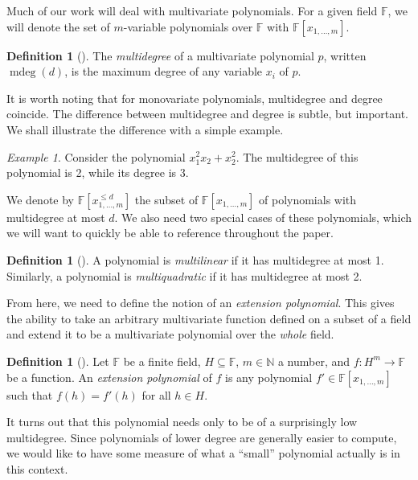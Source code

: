 \documentclass{reedthesis}
\theoremstyle{plain}
\theoremstyle{definition}
\newtheorem{defn}[thm]{Definition}
\theoremstyle{remark}
\newtheorem{example}{Example}[thm]
\DeclareMathOperator{\mdeg}{mdeg}
\numberwithin{equation}{section}
\begin{document}
Much of our work will deal with multivariate polynomials. For a given field
$\mathbb{F}$, we will denote the set of $m$-variable polynomials over
$\mathbb{F}$ with $\mathbb{F}[x_{1, \ldots, m}]$.

\begin{defn}[{\cite[8]{AW09}}]\label{def:mdeg}
  The \emph{multidegree} of a multivariate polynomial $p$, written $\mdeg(d)$,
  is the maximum degree of any variable $x_{i}$ of $p$.
\end{defn}

It is worth noting that for monovariate polynomials, multidegree and degree
coincide. The difference between multidegree and degree is subtle, but
important. We shall illustrate the difference with a simple example.

\begin{example}
  Consider the polynomial $x_{1}^{2}x_{2} + x_{2}^{2}$. The multidegree of this
  polynomial is 2, while its degree is 3.
\end{example}

We denote by $\mathbb{F}[x_{1, \ldots, m}^{\le d}]$ the subset of
$\mathbb{F}[x_{1, \ldots, m}]$ of polynomials with multidegree at most $d$. We also
need two special cases of these polynomials, which we will want to quickly be
able to reference throughout the paper.

\begin{defn}[{\cite[8]{AW09}}]\label{def:mlin}
  A polynomial is \emph{multilinear} if it has multidegree at most 1. Similarly,
  a polynomial is \emph{multiquadratic} if it has multidegree at most 2.
\end{defn}

From here, we need to define the notion of an \emph{extension polynomial}. This
gives the ability to take an arbitrary multivariate function defined on a subset
of a field and extend it to be a multivariate polynomial over the \emph{whole}
field.

\begin{defn}[{\cite[8]{AW09}}]\label{def:ext-poly}
  Let $\mathbb{F}$ be a finite field, $H \subseteq \mathbb{F}$, $m \in \mathbb{N}$ a number, and
  $f: H^{m} \rightarrow \mathbb{F}$ be a function. An \emph{extension polynomial} of $f$
  is any polynomial $f' \in \mathbb{F}[x_{1, \ldots, m}]$ such that $f(h) = f'(h)$ for
  all $h \in H$.
\end{defn}

It turns out that this polynomial needs only to be of a surprisingly low
multidegree. Since polynomials of lower degree are generally easier to compute,
we would like to have some measure of what a ``small'' polynomial actually is in
this context.
\end{document}
